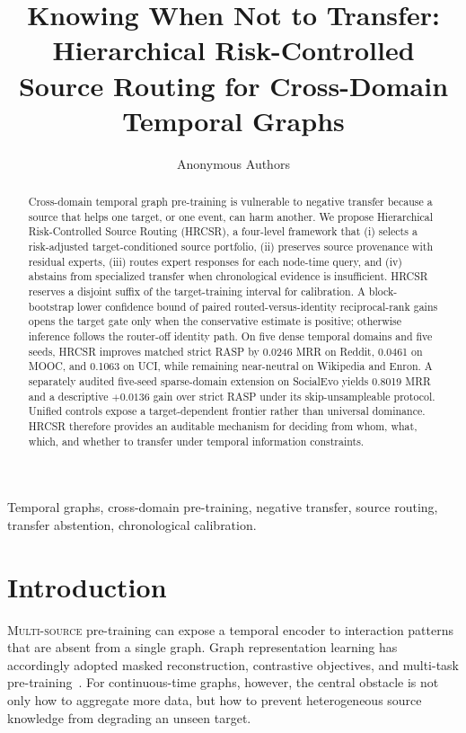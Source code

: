 \documentclass[journal]{IEEEtran}
\title{Knowing When Not to Transfer: Hierarchical Risk-Controlled Source Routing for Cross-Domain Temporal Graphs}
\author{Anonymous Authors}
\begin{document}
\maketitle

\begin{abstract}
Cross-domain temporal graph pre-training is vulnerable to negative transfer because a source that helps one target, or one event, can harm another. We propose Hierarchical Risk-Controlled Source Routing (HRCSR), a four-level framework that (i) selects a risk-adjusted target-conditioned source portfolio, (ii) preserves source provenance with residual experts, (iii) routes expert responses for each node-time query, and (iv) abstains from specialized transfer when chronological evidence is insufficient. HRCSR reserves a disjoint suffix of the target-training interval for calibration. A block-bootstrap lower confidence bound of paired routed-versus-identity reciprocal-rank gains opens the target gate only when the conservative estimate is positive; otherwise inference follows the router-off identity path. On five dense temporal domains and five seeds, HRCSR improves matched strict RASP by 0.0246 MRR on Reddit, 0.0461 on MOOC, and 0.1063 on UCI, while remaining near-neutral on Wikipedia and Enron. A separately audited five-seed sparse-domain extension on SocialEvo yields 0.8019 MRR and a descriptive $+0.0136$ gain over strict RASP under its skip-unsampleable protocol. Unified controls expose a target-dependent frontier rather than universal dominance. HRCSR therefore provides an auditable mechanism for deciding from whom, what, which, and whether to transfer under temporal information constraints.
\end{abstract}

\begin{IEEEkeywords}
Temporal graphs, cross-domain pre-training, negative transfer, source routing, transfer abstention, chronological calibration.
\end{IEEEkeywords}

\section{Introduction}
\lettrine[lines=3,lhang=0.15,nindent=0em]{M}{ulti-source} pre-training can expose a temporal encoder to interaction patterns that are absent from a single graph. Graph representation learning has accordingly adopted masked reconstruction, contrastive objectives, and multi-task pre-training~\cite{hu2020gpt,qiu2020gcc,you2020graph,hou2022graphmae}. For continuous-time graphs, however, the central obstacle is not only how to aggregate more data, but how to prevent heterogeneous source knowledge from degrading an unseen target.
\end{document}
